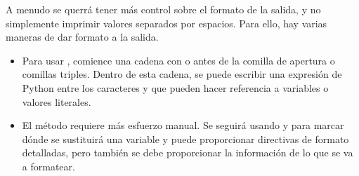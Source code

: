 \documentclass[a4,10pt,spanish]{sphinxmanual}
\begin{document}
\sphinxAtStartPar
A menudo se querrá tener más control sobre el formato de la salida, y no  simplemente imprimir valores separados por espacios. Para ello, hay varias maneras de dar formato a la salida.
\begin{itemize}
\item {} 
\sphinxAtStartPar
Para usar {\hyperref[\detokenize{tutorial/inputoutput:tut-f-strings}]{}}, comience una cadena con  o  antes de la comilla de apertura o comillas triples. Dentro de esta cadena,  se puede escribir una expresión de Python entre los caracteres \sphinxcode{\sphinxupquote{\{}} y \sphinxcode{\sphinxupquote{\}}} que pueden hacer referencia a variables o valores literales.

\begin{sphinxVerbatim}[commandchars=\\\{\}]
  
  
\end{sphinxVerbatim}

\item {} 
\sphinxAtStartPar
El método   requiere más esfuerzo manual.  Se seguirá usando \sphinxcode{\sphinxupquote{\{}} y \sphinxcode{\sphinxupquote{\}}} para marcar dónde se sustituirá una variable y puede proporcionar directivas de formato detalladas, pero también se debe proporcionar la información de lo que se va a formatear.

\begin{sphinxVerbatim}[commandchars=\\\{\}]
  
  
      
 
\end{sphinxVerbatim}


\end{itemize}
\end{document}
